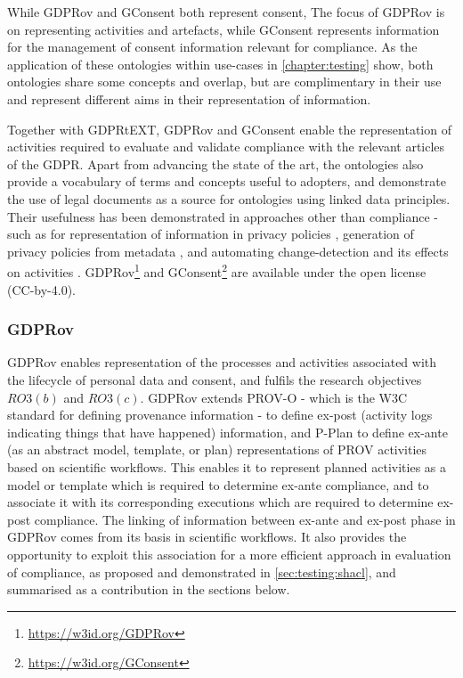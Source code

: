 While GDPRov and GConsent both represent consent, The focus of GDPRov is on representing activities and artefacts, while GConsent represents information for the management of consent information relevant for compliance.
As the application of these ontologies within use-cases in \autoref{chapter:testing} show, both ontologies share some concepts and overlap, but are complimentary in their use and represent different aims in their representation of information.

Together with GDPRtEXT, GDPRov and GConsent enable the representation of activities required to evaluate and validate compliance with the relevant articles of the GDPR. Apart from advancing the state of the art, the ontologies also provide a vocabulary of terms and concepts useful to adopters, and demonstrate the use of legal documents as a source for ontologies using linked data principles.
Their usefulness has been demonstrated in approaches other than compliance - such as for representation of information in privacy policies \cite{pandit_ontology_2018}, generation of privacy policies from metadata \cite{pandit_personalised_2018}, and automating change-detection and its effects on activities \cite{pandit_gdpr-driven_2018}.
GDPRov\footnote{\url{https://w3id.org/GDPRov}} and GConsent\footnote{\url{https://w3id.org/GConsent}} are available under the open license (CC-by-4.0).

\subsubsection{GDPRov}
GDPRov enables representation of the processes and activities associated with the lifecycle of personal data and consent, and  fulfils the research objectives $RO3(b)$ and $RO3(c)$.
GDPRov extends PROV-O \cite{lebo_prov-o:_2013} - which is the W3C standard for defining provenance information - to define ex-post (activity logs indicating things that have happened) information, and P-Plan \cite{garijo_p-plan_2014} to define ex-ante (as an abstract model, template, or plan) representations of PROV activities based on scientific workflows.
This enables it to represent planned activities as a model or template which is required to determine ex-ante compliance, and to associate it with its corresponding executions which are required to determine ex-post compliance.
The linking of information between ex-ante and ex-post phase in GDPRov comes from its basis in scientific workflows. It also provides the opportunity to exploit this association for a more efficient approach in evaluation of compliance, as proposed and demonstrated in \autoref{sec:testing:shacl}, and summarised as a contribution in the sections below.

